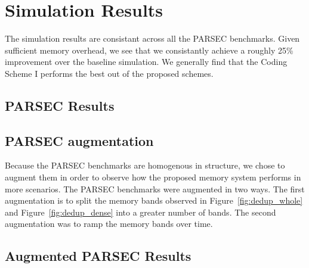 \section{Simulation Results}
\label{sec:simulation}
The simulation results are consistant across all the PARSEC benchmarks. Given sufficient memory overhead, we see that we consistantly achieve a roughly 25\% improvement over the baseline simulation. We generally find that the Coding Scheme I performs the best out of the proposed schemes. 

\subsection{PARSEC Results}


\subsection{PARSEC augmentation}
Because the PARSEC benchmarks are homogenous in structure, we chose to augment them in order to observe how the proposed memory system performs in more scenarios. The PARSEC benchmarks were augmented in two ways. The first augmentation is to split the memory bands observed in Figure~\ref{fig:dedup_whole} and Figure~\ref{fig:dedup_dense} into a greater number of bands. The second augmentation was to ramp the memory bands over time.	


\subsection{Augmented PARSEC Results}

